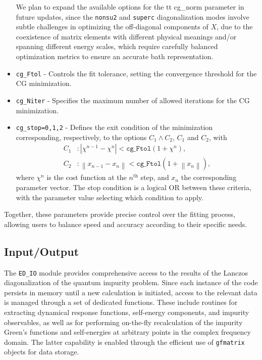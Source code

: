 \documentclass[edipack_sp.tex]{subfiles}
\begin{document}
\begin{itemize}
We plan to expand the available options for the {tt cg\_norm} parameter in future \NAME updates, since the {\tt nonsu2} and {\tt superc} diagonalization modes involve subtle challenges in optimizing the off-diagonal components of $X$, due to the coexistence of matrix elements with different physical meanings and/or spanning different energy scales, which require carefully balanced optimization metrics to ensure an accurate bath representation.
\item \texttt{cg\_Ftol} - Controls the fit tolerance, setting the 
convergence threshold for the CG minimization.
\item \texttt{cg\_Niter} - Specifies the maximum number of allowed 
iterations for the CG minimization.
\item \texttt{cg\_stop=0,1,2} - Defines the exit condition of the 
minimization corresponding, respectively, to the options  $C_1\land C_2$, $C_1$ and $C_2$, with
\begin{align*}
C_1 & : |\chi^{n-1} - \chi^n| < \mathtt{cg\_Ftol} (1+\chi^n), \\
C_2 & : \left\|x_{n-1} - x_n\right\| < 
\mathtt{cg\_Ftol} (1+\left\|x_n\right\|),
\end{align*}
where $\chi^n$ is the cost function at the $n^\mathrm{th}$ step, and 
$x_n$ the corresponding parameter vector. The stop condition is a 
logical OR between these criteria, with the parameter value selecting 
which condition to apply.
\end{itemize}

Together, these parameters provide precise control over the fitting 
process, allowing users to balance speed and accuracy according to 
their specific needs.



\subsection{Input/Output}\label{sSecIO}
The \texttt{ED\_IO} module provides comprehensive access to the 
results of the Lanczos diagonalization of the quantum impurity 
problem. Since each instance of the code persists in memory until a 
new calculation is initiated, access to the relevant data is managed 
through a set of dedicated functions. These include routines for 
extracting dynamical response functions, self-energy components, and 
impurity observables, as well as for performing on-the-fly 
recalculation of the impurity Green's functions and self-energies at 
arbitrary points in the complex frequency domain. The latter 
capability is enabled through the efficient use of \texttt{gfmatrix} 
objects for data storage.
\end{document}
